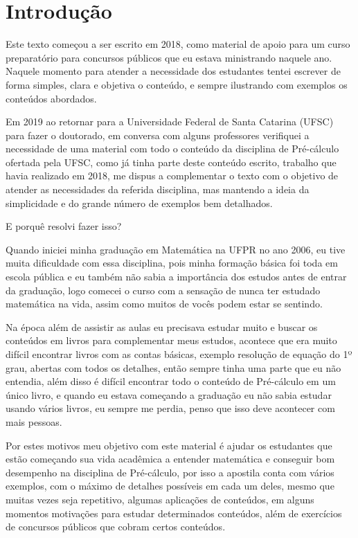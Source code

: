 
\chapter{Introdução} 

Este texto começou a ser escrito em 2018, como material de apoio para um curso preparatório para concursos públicos que eu estava ministrando naquele ano. Naquele momento para atender a necessidade dos estudantes tentei escrever de forma simples, clara e objetiva o conteúdo, e sempre ilustrando com exemplos os conteúdos abordados.

Em 2019 ao retornar para a Universidade Federal de Santa Catarina (UFSC) para fazer o doutorado, em conversa com alguns professores verifiquei a necessidade de uma material com todo o conteúdo da disciplina de Pré-cálculo ofertada pela UFSC, como já tinha parte deste conteúdo escrito, trabalho que havia realizado em 2018, me dispus a complementar o texto com o objetivo de atender as necessidades da referida disciplina, mas mantendo a ideia da simplicidade e do grande número de exemplos bem detalhados. 

E porquê resolvi fazer isso?

Quando iniciei minha graduação em Matemática na UFPR no ano 2006, eu tive muita dificuldade com essa disciplina, pois minha formação básica foi toda em escola pública e eu também não sabia a importância dos estudos antes de entrar da graduação, logo comecei o curso com a sensação de nunca ter estudado matemática na vida, assim como muitos de vocês podem estar se sentindo. 

Na época além de assistir as aulas eu precisava estudar muito e buscar os conteúdos em livros para complementar meus estudos, acontece que era muito difícil encontrar livros com as contas básicas, exemplo resolução de equação do 1º grau, abertas com todos os detalhes, então sempre tinha uma parte que eu não entendia, além disso é difícil encontrar todo o conteúdo de Pré-cálculo em um único livro, e quando eu estava começando a graduação eu não sabia estudar usando vários livros, eu sempre me perdia, penso que isso deve acontecer com mais pessoas.

Por estes motivos meu objetivo com este material é ajudar os estudantes que estão começando sua vida acadêmica a entender matemática e conseguir bom desempenho na disciplina de Pré-cálculo, por isso a apostila conta com vários exemplos, com o máximo de detalhes possíveis em cada um deles, mesmo que muitas vezes seja repetitivo, algumas aplicações de conteúdos, em alguns momentos motivações para estudar determinados conteúdos, além de exercícios de concursos públicos que cobram certos conteúdos. 

